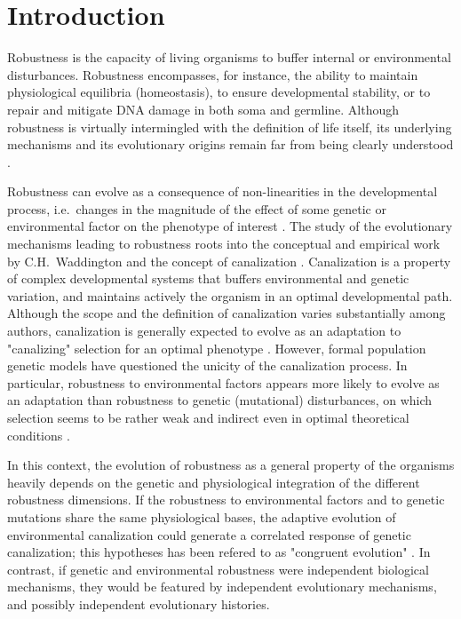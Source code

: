 \documentclass[10pt,a4paper]{article}
\begin{document}
\section{Introduction}

Robustness is the capacity of living organisms to buffer internal or environmental disturbances. Robustness encompasses, for instance, the ability to maintain physiological equilibria (homeostasis), to ensure developmental stability, or to repair and mitigate DNA damage in both soma and germline. Although robustness is virtually intermingled with the definition of life itself, its underlying mechanisms and its evolutionary origins remain far from being clearly understood \citep{Ste02,MS09,HGK+19}. 

Robustness can evolve as a consequence of non-linearities in the developmental process, i.e.\ changes in the magnitude of the effect of some genetic or environmental factor on the phenotype of interest \citep{Nij02}. The study of the evolutionary mechanisms leading to robustness roots into the conceptual and empirical work by C.H.\ Waddington and the concept of canalization \citep{Wad42,Sch49,Wad59,Loi19}. Canalization is a property of complex developmental systems that buffers environmental and genetic variation, and maintains actively the organism in an optimal developmental path. Although the scope and the definition of canalization varies substantially among authors, canalization is generally expected to evolve as an adaptation to "canalizing" selection for an optimal phenotype \citep{EM98,DD01,Fla05,Kli19}. However, formal population genetic models have questioned the unicity of the canalization process. In particular, robustness to environmental factors appears more likely to evolve as an adaptation than robustness to genetic (mutational) disturbances, on which selection seems to be rather weak and indirect even in optimal theoretical conditions \citep{WBB97, HHW03,LAH13}. 

In this context, the evolution of robustness as a general property of the organisms heavily depends on the genetic and physiological integration of the different robustness dimensions. If the robustness to environmental factors and to genetic mutations share the same physiological bases, the adaptive evolution of environmental canalization could generate a correlated response of genetic canalization; this hypotheses has been refered to as "congruent evolution" \citep{dHW+03}. In contrast, if genetic and environmental robustness were independent biological mechanisms, they would be featured by independent evolutionary mechanisms, and possibly independent evolutionary histories. 
\end{document}
